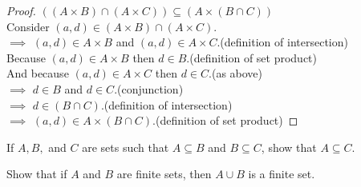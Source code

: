 \documentclass[a4paper]{exam}
\theoremstyle{definition}
\newcommand\Z{\ensuremath{\mathbb{Z}}}
\newcommand\union{\cup}
\newcommand\interx{\cap}
\begin{document}
\begin{questions}
\begin{parts}
\begin{solution}
      \begin{proof}$ ((A \times B) \interx (A \times C)) \subseteq (A \times (B \interx C))$\\
        Consider $(a,d)\in (A \times B) \interx (A \times C)$.\\
        $\implies$ $(a,d)\in A\times B$ and $(a,d)\in A\times C$.\hfill(definition of intersection)\\
        Because $(a,d)\in A\times B$ then $d\in B$.\hfill(definition of set product)\\
        And because $(a,d)\in A\times C$ then $d\in C$.\hfill(as above)\\
        $\implies$ $d\in B$ and $d\in C$.\hfill(conjunction)\\
        $\implies$ $d\in (B\interx C)$.\hfill(definition of intersection)\\
        $\implies$ $(a,d)\in A\times (B\interx C)$.\hfill(definition of set product)
      \end{proof}
    \end{solution}
  \end{parts}
  
\question If $A, B,$ and $C$ are sets such that $A \subseteq B$ and $B \subseteq C$, show that $A \subseteq C$.

  \begin{solution}
  \end{solution}

\question Show that if $A$ and $B$ are finite sets, then  \( A \union B \) is a finite set.

  \begin{solution}
  \end{solution}
  
\question


\end{questions}
\end{document}

